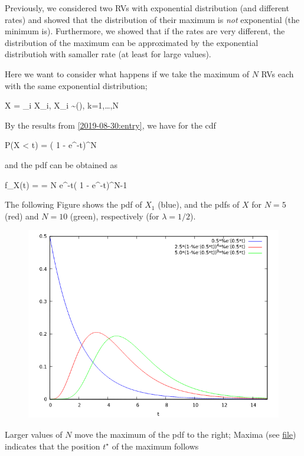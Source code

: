 
Previously, we considered two RVs with exponential distribution (and different rates) and showed that the distribution of their maximum is \emph{not} exponential (the minimum is). Furthermore, we showed that if the rates are very different, the distribution of the maximum can be approximated by the exponential distributioh with samaller rate (at least for large values).

Here we want to consider what happens if we take the maximum of $N$ RVs each with the same exponential distribution; 

\bee
X = \max_i X_i, \quad X_i \sim {}(\lambda), \quad k=1,\ldots,N
\eee

By the results from \ref{2019-08-30:entry}, we have for the cdf

\bee
P(X < t) = \left( 1 - e^{-\lambda t}\right)^N
\eee

and the pdf can be obtained as

\bee
f_X(t) =  = \lambda N e^{-\lambda t}\left( 1 - e^{-\lambda t}\right)^{N-1}
\eee

The following Figure shows the pdf of $X_1$ (blue), and the pdfs of $X$ for $N=5$ (red) and $N=10$ (green), respectively (for $\lambda = 1/2$).

\begin{figure}[hbt!]
\centering
\includegraphics[scale=0.7]{images/exp_pdf_2_1.png}
\end{figure}

Larger values of $N$ move the maximum of the pdf to the right; Maxima (see \href{files/2019-09-06-exponential_pdf_3.wxmx}{file}) indicates that the position $t^\star$ of the maximum follows

